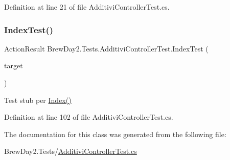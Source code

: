 Definition at line 21 of file Additivi\+Controller\+Test.\+cs.

\mbox{\label{class_brew_day2_1_1_tests_1_1_additivi_controller_test_a1bd4b734b576e17e441acfb2b4880704}} 
\subsubsection{\texorpdfstring{Index\+Test()}{IndexTest()}}
{\footnotesize\ttfamily Action\+Result Brew\+Day2.\+Tests.\+Additivi\+Controller\+Test.\+Index\+Test (\begin{DoxyParamCaption}\item[{\mbox{[}\+Pex\+Assume\+Under\+Test\mbox{]} \mbox{\hyperlink{class_brew_day2_1_1_controllers_1_1_additivi_controller}{Additivi\+Controller}}}]{target }\end{DoxyParamCaption})}



Test stub per \mbox{\hyperlink{class_brew_day2_1_1_tests_1_1_additivi_controller_test_a58526dd197cdb5d5113c2a84b6687075}{Index()}}



Definition at line 102 of file Additivi\+Controller\+Test.\+cs.



The documentation for this class was generated from the following file\+:\begin{DoxyCompactItemize}
\item 
Brew\+Day2.\+Tests/\mbox{\hyperlink{_additivi_controller_test_8cs}{Additivi\+Controller\+Test.\+cs}}\end{DoxyCompactItemize}
